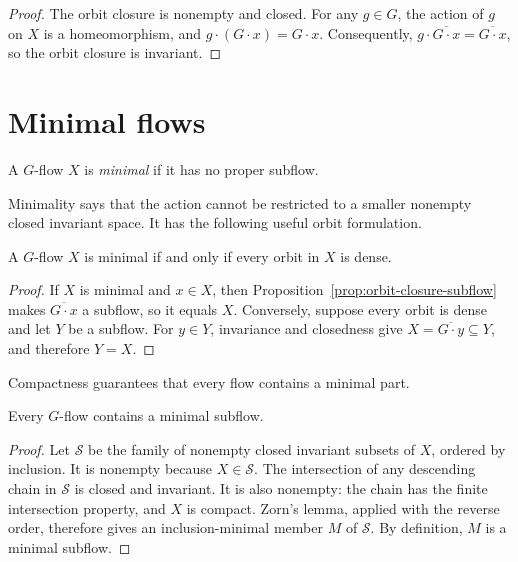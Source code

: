 \begin{proof}
    The orbit closure is nonempty and closed.  For any \(g\in G\), the action
    of \(g\) on \(X\) is a homeomorphism, and
    \(g\cdot(G\cdot x)=G\cdot x\).  Consequently,
    \(g\cdot\overline{G\cdot x}=\overline{G\cdot x}\), so the orbit closure is
    invariant.
\end{proof}

\section{Minimal flows}

\begin{definition}
    A \(G\)-flow \(X\) is \emph{minimal} if it has no proper subflow.
\end{definition}

Minimality says that the action cannot be restricted to a smaller nonempty
closed invariant space.  It has the following useful orbit formulation.

\begin{proposition}
    \label{prop:minimal-dense-orbits}
    A \(G\)-flow \(X\) is minimal if and only if every orbit in \(X\) is dense.
\end{proposition}

\begin{proof}
    If \(X\) is minimal and \(x\in X\), then
    Proposition~\ref{prop:orbit-closure-subflow} makes
    \(\overline{G\cdot x}\) a subflow, so it equals \(X\).  Conversely, suppose
    every orbit is dense and let \(Y\) be a subflow.  For \(y\in Y\),
    invariance and closedness give
    \(X=\overline{G\cdot y}\subseteq Y\), and therefore \(Y=X\).
\end{proof}

Compactness guarantees that every flow contains a minimal part.

\begin{proposition}
    \label{prop:existence-minimal-subflow}
    Every \(G\)-flow contains a minimal subflow.
\end{proposition}

\begin{proof}
    Let \(\mathcal S\) be the family of nonempty closed invariant subsets of
    \(X\), ordered by inclusion.  It is nonempty because \(X\in\mathcal S\).
    The intersection of any descending chain in \(\mathcal S\) is closed and
    invariant.  It is also nonempty: the chain has the finite intersection
    property, and \(X\) is compact.  Zorn's lemma, applied with the reverse
    order, therefore gives an inclusion-minimal member \(M\) of \(\mathcal S\).
    By definition, \(M\) is a minimal subflow.
\end{proof}

